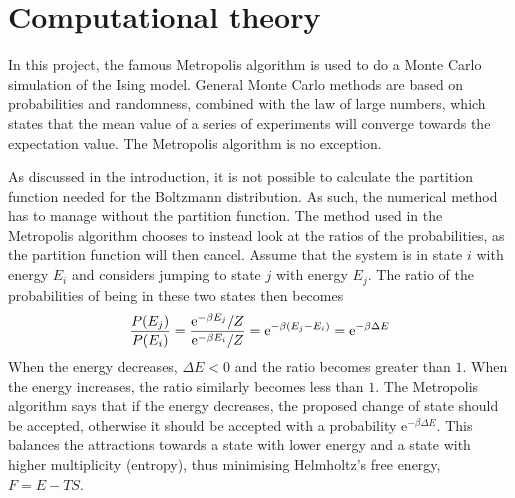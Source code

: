 \documentclass[12pt,english,a4paper]{article}
\renewcommand{\exp}[1]{\mathrm{e}^{#1}}
\begin{document}
\section{Computational theory}
In this project, the famous Metropolis algorithm is used to do a Monte Carlo simulation of the Ising model. General Monte Carlo methods are based on probabilities and randomness, combined with the law of large numbers, which states that the mean value of a series of experiments will converge towards the expectation value. The Metropolis algorithm is no exception.

As discussed in the introduction, it is not possible to calculate the partition function needed for the Boltzmann distribution. As such, the numerical method has to manage without the partition function. The method used in the Metropolis algorithm chooses to instead look at the ratios of the probabilities, as the partition function will then cancel. Assume that the system is in state \(i\) with energy \(E_i\) and considers jumping to state \(j\) with energy \(E_j\). The ratio of the probabilities of being in these two states then becomes
\[
\frac{P(E_j)}{P(E_i)} = \frac{\exp{-\beta E_j}/Z}{\exp{-\beta E_i}/Z} = \exp{-\beta\qty(E_j-E_i)} = \exp{-\beta\Delta E}
\]
When the energy decreases, \(\Delta E<0\) and the ratio becomes greater than \(1\). When the energy increases, the ratio similarly becomes less than \(1\). The Metropolis algorithm says that if the energy decreases, the proposed change of state should be accepted, otherwise it should be accepted with a probability \(\exp{-\beta\Delta E}\). This balances the attractions towards a state with lower energy and a state with higher multiplicity (entropy), thus minimising Helmholtz's free energy, \(F=E-TS\).
\end{document}
